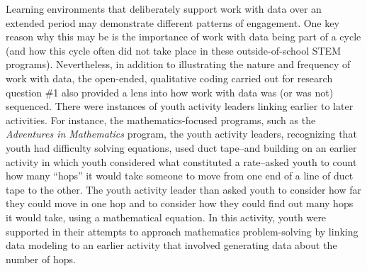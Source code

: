 \documentclass[]{book}
\theoremstyle{definition}
\theoremstyle{definition}
\theoremstyle{definition}
\theoremstyle{remark}
\begin{document}
Learning environments that deliberately support work with data over an
extended period may demonstrate different patterns of engagement. One
key reason why this may be is the importance of work with data being
part of a cycle (and how this cycle often did not take place in these
outside-of-school STEM programs). Nevertheless, in addition to
illustrating the nature and frequency of work with data, the open-ended,
qualitative coding carried out for research question \#1 also provided a
lens into how work with data was (or was not) sequenced. There were
instances of youth activity leaders linking earlier to later activities.
For instance, the mathematics-focused programs, such as the
\emph{Adventures in Mathematics} program, the youth activity leaders,
recognizing that youth had difficulty solving equations, used duct
tape--and building on an earlier activity in which youth considered what
constituted a rate--asked youth to count how many ``hops'' it would take
someone to move from one end of a line of duct tape to the other. The
youth activity leader than asked youth to consider how far they could
move in one hop and to consider how they could find out many hops it
would take, using a mathematical equation. In this activity, youth were
supported in their attempts to approach mathematics problem-solving by
linking data modeling to an earlier activity that involved generating
data about the number of hops.
\end{document}
